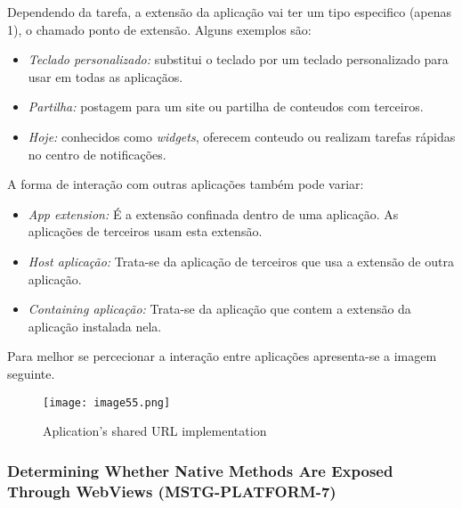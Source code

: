 Dependendo da tarefa, a extensão da aplicação vai ter um tipo especifico (apenas 1), o chamado ponto de extensão. Alguns exemplos são:
\begin{itemize}
\item \textit{Teclado personalizado:} substitui o teclado por um teclado personalizado para usar em todas as aplicaçãos.\par
\hfill\par

\item \textit{Partilha:} postagem para um site ou partilha de conteudos com terceiros.\par
\hfill\par

\item \textit{Hoje:} conhecidos como \textit{widgets}, oferecem conteudo ou realizam tarefas rápidas no centro de notificações.
\end{itemize}
A forma de interação com outras aplicações também pode variar:
\begin{itemize}
\item \textit{App extension:} É a extensão confinada dentro de uma aplicação. As aplicações de terceiros usam esta extensão.\par
\hfill\par

\item \textit{Host aplicação:} Trata-se da aplicação de terceiros que usa a extensão de outra aplicação.\par
\hfill\par

\item \textit{Containing aplicação:} Trata-se da aplicação que contem a extensão da aplicação instalada nela. \par
\hfill\par
\end{itemize}
Para melhor se percecionar a interação entre aplicações apresenta-se a imagem seguinte.

\begin{figure}[H]
\centering
\texttt{[image: image55.png]}
\caption {Aplication's shared URL implementation}
\label {fig02}
\end{figure}



\subsubsection{Determining Whether Native Methods Are Exposed Through WebViews (MSTG-PLATFORM-7)}
\hfill\par
\hfill\par

